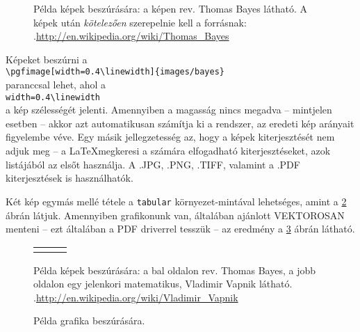 \begin{figure}[t]
  \centering
  \caption[Példa képek beszúrására]%
  {Példa képek beszúrására: a képen rev. Thomas Bayes látható. A képek után {\em kötelezően} szerepelnie kell a forrásnak:\\
  {\white .}\hfill\url{http://en.wikipedia.org/wiki/Thomas_Bayes}}
  \label{fig:ALAP:sm1}
\end{figure}

Képeket beszúrni a\\
 \verb+\pgfimage[width=0.4\linewidth]{images/bayes}+\\
paranccsal lehet, ahol a\\
\verb+width=0.4\linewidth+ \\
a kép szélességét jelenti. Amennyiben a magasság nincs megadva -- mintjelen esetben -- akkor azt automatikusan számítja ki a rendszer, az eredeti kép arányait figyelembe véve.
Egy másik jellegzetesség az, hogy a képek kiterjesztését nem adjuk meg -- a \LaTeX megkeresi a számára elfogadható kiterjesztéseket, azok listájából az elsőt használja. A .JPG, .PNG, .TIFF, valamint a .PDF kiterjesztések is használhatók.

Két kép egymás mellé tétele a \verb+tabular+ környezet-mintával lehetséges, amint a \ref{fig:ALAP:sm2} ábrán látjuk.
Amennyiben grafikonunk van, általában ajánlott VEKTOROSAN menteni -- ezt általában a PDF driverrel tesszük -- az eredmény a \ref{fig:ALAP:sm3} ábrán látható.

\begin{figure}[t]
  \centering
  \begin{tabular}{ccc}
		  \pgfimage[height=4cm]{images/bayes}
		  &
		  \pgfimage[height=4cm]{images/vapnik}
	\end{tabular}
  \caption[Példa képek beszúrására egy táblában]%
  {Példa képek beszúrására: a bal oldalon rev. Thomas Bayes, a jobb oldalon egy jelenkori matematikus, Vladimir Vapnik látható.\\
  {\white .}\url{http://en.wikipedia.org/wiki/Vladimir_Vapnik}}
  \label{fig:ALAP:sm2}
\end{figure}

\begin{figure}[t]
  \centering
  \caption[Példa grafika beszúrására]%
  {Példa grafika beszúrására.}
  \label{fig:ALAP:sm3}
\end{figure}

